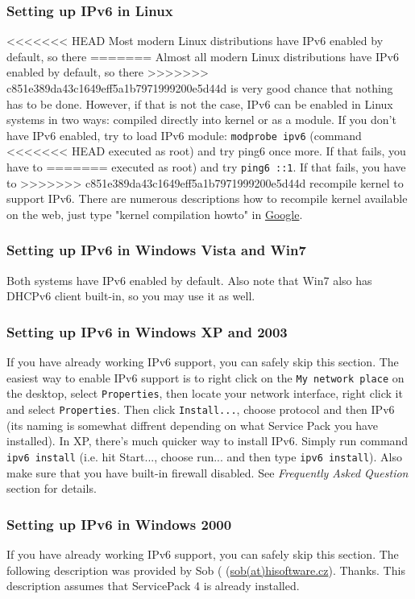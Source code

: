 \subsubsection{Setting up IPv6 in Linux}
<<<<<<< HEAD
Most modern Linux distributions have IPv6 enabled by default, so there
=======
Almost all modern Linux distributions have IPv6 enabled by default, so there
>>>>>>> c851e389da43c1649eff5a1b7971999200e5d44d
is very good chance that nothing has to be done. However, if that is
not the case, IPv6 can be enabled in Linux systems in two ways:
compiled directly into kernel or as a module. If you don't have IPv6
enabled, try to load IPv6 module: \verb+modprobe ipv6+ (command
<<<<<<< HEAD
executed as root) and try ping6 once more. If that fails, you have to
=======
executed as root) and try \verb+ping6 ::1+. If that fails, you have to
>>>>>>> c851e389da43c1649eff5a1b7971999200e5d44d
recompile kernel to support IPv6. There are numerous descriptions how
to recompile kernel available on the web, just type "kernel
compilation howto" in \href{http://www.google.com}{Google}.

\subsubsection{Setting up IPv6 in Windows Vista and Win7}
Both systems have IPv6 enabled by default. Also note that Win7 also
has DHCPv6 client built-in, so you may use it as well.

\subsubsection{Setting up IPv6 in Windows XP and 2003}
If you have already working IPv6 support, you can safely skip this section.
The easiest way to enable IPv6 support is to right click on the
\verb+My network place+ on the desktop, select \verb+Properties+, then locate
your network interface, right click it and select \verb+Properties+. Then
click \verb+Install...+, choose protocol and then IPv6 (its naming is
somewhat diffrent depending on what Service Pack you have installed).
In XP, there's much quicker way to install IPv6. Simply run command
\verb+ipv6 install+ (i.e. hit Start..., choose run... and then type
\verb+ipv6 install+). Also make sure that you have built-in firewall
disabled. See \emph{Frequently Asked Question} section for details.

\subsubsection{Setting up IPv6 in Windows 2000}
If you have already working IPv6 support, you can safely skip this
section. The following description was provided by Sob (
(\href{mailto:sob(at)hisoftware.cz}{sob(at)hisoftware.cz}). Thanks. This
description assumes that ServicePack 4 is already installed.

